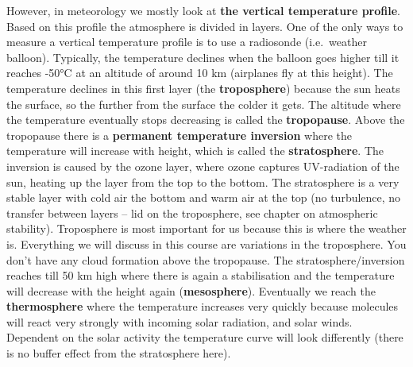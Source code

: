 \documentclass[12pt,oneside]{book}
\begin{document}
However, in meteorology we mostly look at \textbf{the vertical
temperature profile}. Based on this profile the atmosphere is divided in
layers. One of the only ways to measure a vertical temperature profile
is to use a radiosonde (i.e.~weather balloon). Typically, the
temperature declines when the balloon goes higher till it reaches -50°C
at an altitude of around 10 km (airplanes fly at this height). The
temperature declines in this first layer (the \textbf{troposphere})
because the sun heats the surface, so the further from the surface the
colder it gets. The altitude where the temperature eventually stops
decreasing is called the \textbf{tropopause}. Above the tropopause there
is a \textbf{permanent temperature inversion} where the temperature will
increase with height, which is called the \textbf{stratosphere}. The
inversion is caused by the ozone layer, where ozone captures
UV-radiation of the sun, heating up the layer from the top to the
bottom. The stratosphere is a very stable layer with cold air the bottom
and warm air at the top (no turbulence, no transfer between layers --
lid on the troposphere, see chapter on atmospheric stability).
Troposphere is most important for us because this is where the weather
is. Everything we will discuss in this course are variations in the
troposphere. You don't have any cloud formation above the tropopause.
The stratosphere/inversion reaches till 50 km high where there is again
a stabilisation and the temperature will decrease with the height again
(\textbf{mesosphere}). Eventually we reach the \textbf{thermosphere}
where the temperature increases very quickly because molecules will
react very strongly with incoming solar radiation, and solar winds.
Dependent on the solar activity the temperature curve will look
differently (there is no buffer effect from the stratosphere here).
\end{document}
